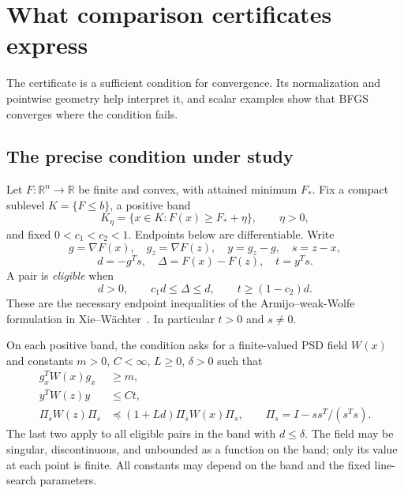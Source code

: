 \chapter{What comparison certificates express}\label{comp:G}\label{G:chapter}
\renewcommand{\ModuleTag}{5}
The certificate is a sufficient condition for convergence. Its normalization and pointwise geometry help interpret it, and scalar examples show that BFGS converges where the condition fails.


\begingroup
\providecommand{\R}{}
\renewcommand{\R}{\mathbb R}
\providecommand{\PSD}{}
\renewcommand{\PSD}{\succeq0}
\providecommand{\range}{}
\renewcommand{\range}{\operatorname{range}}
\providecommand{\aff}{}
\renewcommand{\aff}{\operatorname{aff}}
\providecommand{\conv}{}
\renewcommand{\conv}{\operatorname{conv}}
\providecommand{\norm}{}
\renewcommand{\norm}[1]{\left\|#1\right\|}
\providecommand{\ip}{}
\renewcommand{\ip}[2]{\langle #1,#2\rangle}
\makeatletter\let\c@lemma\c@theorem\let\c@corollary\c@theorem\let\c@proposition\c@theorem\let\c@remark\c@theorem\makeatother
\renewcommand{\thelemma}{\thetheorem}\renewcommand{\thecorollary}{\thetheorem}\renewcommand{\theproposition}{\thetheorem}\renewcommand{\theremark}{\thetheorem}
\renewcommand{\thetheorem}{5.\arabic{section}.\arabic{theorem}}
\setcounter{section}{0}
\setcounter{theorem}{0}
\setcounter{equation}{0}


\section{The precise condition under study}
Let $F:\R^n\to\R$ be finite and convex, with attained minimum $F_*$. Fix a compact sublevel $K=\{F\le b\}$, a positive band
\[
 K_\eta=\{x\in K:F(x)\ge F_*+\eta\},\qquad \eta>0,
\]
and fixed $0<c_1<c_2<1$. Endpoints below are differentiable. Write
\[
 g=\nabla F(x),\quad g_z=\nabla F(z),\quad y=g_z-g,\quad s=z-x,
\]
\[
 d=-g^Ts,\quad \Delta=F(x)-F(z),\quad t=y^Ts.
\]
A pair is \emph{eligible} when
\begin{equation}
 d>0,\qquad c_1d\le\Delta\le d,\qquad t\ge(1-c_2)d. \tag{5.E}
\end{equation}
These are the necessary endpoint inequalities of the Armijo--weak-Wolfe formulation in Xie--W\"achter~\cite{XW}. In particular $t>0$ and $s\ne0$.

On each positive band, the condition asks for a finite-valued PSD field $W(x)$ and constants $m>0$, $C<\infty$, $L\ge0$, $\delta>0$ such that
\begin{align}
 g_x^TW(x)g_x&\ge m, \tag{5.V}\\
 y^TW(z)y&\le Ct, \tag{5.S}\\
 \Pi_sW(z)\Pi_s&\preceq(1+Ld)\Pi_sW(x)\Pi_s,
 \qquad \Pi_s=I-ss^T/(s^Ts). \tag{5.T}
\end{align}
The last two apply to all eligible pairs in the band with $d\le\delta$. The field may be singular, discontinuous, and unbounded as a function on the band; only its value at each point is finite. All constants may depend on the band and the fixed line-search parameters.

